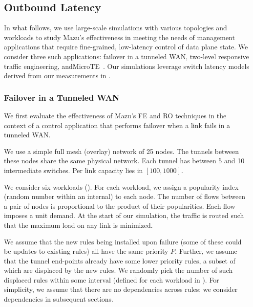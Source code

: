 \subsection{Outbound Latency} 
In what follows, we use large-scale simulations with various topologies and
workloads to study Mazu's effectiveness in meeting the needs of management
applications that require fine-grained, low-latency control of data plane
state. We consider three such applications: failover in a tunneled WAN, 
two-level responsive traffic engineering, and\linebreak MicroTE~\cite{microte}.
Our simulations leverage switch latency models derived from our measurements
in .

\subsubsection{Failover in a Tunneled WAN}%
\label{s:fe_eval}

We first evaluate the effectiveness of Mazu's FE and RO techniques in the
context of a control application that performs failover when a link fails in  
a tunneled WAN.


 We use a simple full mesh (overlay) network of 25
nodes.  The tunnels between these nodes share the same physical network. Each
tunnel has between 5 and 10 intermediate switches. Per link capacity lies in
$[100,1000]$.

 We consider six workloads (). For
each workload,
we assign a popularity index (random number
within an internal) to each node. The number of flows between a pair
of nodes is proportional to the product of their popularities. Each flow
imposes a unit demand. At the start of our simulation, the traffic is routed
such that the maximum load on any link is minimized.

 We assume that the new rules being installed
upon failure (some of these could be updates to existing rules) all have the
same priority $P$. Further, we assume that the tunnel end-points already have
some lower priority rules, a subset of which are displaced by the new
rules. We randomly pick the number of such displaced rules within some
interval (defined for each workload in ). For simplicity, we
assume that there are no dependencies across rules; we consider dependencies
in subsequent sections.

